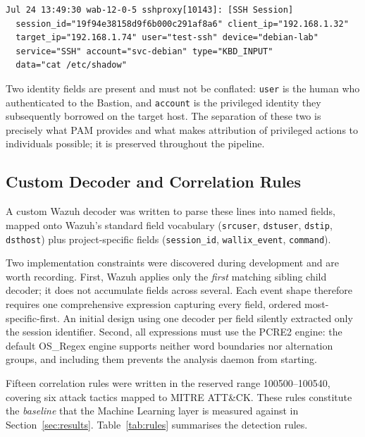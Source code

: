 \documentclass{classeENS}
\begin{document}
\begin{verbatim}
Jul 24 13:49:30 wab-12-0-5 sshproxy[10143]: [SSH Session]
  session_id="19f94e38158d9f6b000c291af8a6" client_ip="192.168.1.32"
  target_ip="192.168.1.74" user="test-ssh" device="debian-lab"
  service="SSH" account="svc-debian" type="KBD_INPUT"
  data="cat /etc/shadow"
\end{verbatim}

Two identity fields are present and must not be conflated: \texttt{user} is the human who authenticated to the Bastion, and \texttt{account} is the privileged identity they subsequently borrowed on the target host. The separation of these two is precisely what PAM provides and what makes attribution of privileged actions to individuals possible; it is preserved throughout the pipeline.

\subsection{Custom Decoder and Correlation Rules}
A custom Wazuh decoder was written to parse these lines into named fields, mapped onto Wazuh's standard field vocabulary (\texttt{srcuser}, \texttt{dstuser}, \texttt{dstip}, \texttt{dsthost}) plus project-specific fields (\texttt{session\_id}, \texttt{wallix\_event}, \texttt{command}).

Two implementation constraints were discovered during development and are worth recording. First, Wazuh applies only the \emph{first} matching sibling child decoder; it does not accumulate fields across several. Each event shape therefore requires one comprehensive expression capturing every field, ordered most-specific-first. An initial design using one decoder per field silently extracted only the session identifier. Second, all expressions must use the PCRE2 engine: the default OS\_Regex engine supports neither word boundaries nor alternation groups, and including them prevents the analysis daemon from starting.

Fifteen correlation rules were written in the reserved range 100500--100540, covering six attack tactics mapped to MITRE ATT\&CK. These rules constitute the \emph{baseline} that the Machine Learning layer is measured against in Section~\ref{sec:results}. Table~\ref{tab:rules} summarises the detection rules.
\end{document}
